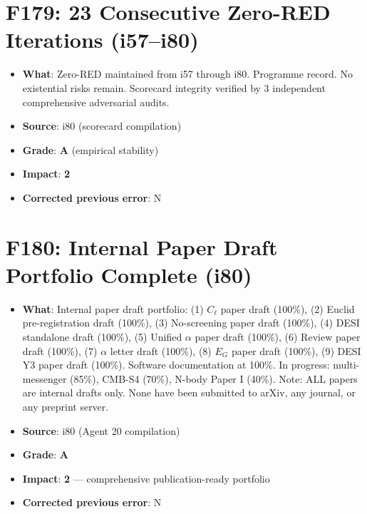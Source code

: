 \documentclass[11pt,a4paper]{article}
\newcommand{\grade}[1]{\textbf{#1}}
\newcommand{\impact}[1]{\textbf{#1}}
\begin{document}
\section{F179: 23 Consecutive Zero-RED Iterations (i57--i80)}
\begin{itemize}[nosep]
\item \textbf{What}: Zero-RED maintained from i57 through i80. Programme record. No existential risks remain. Scorecard integrity verified by 3 independent comprehensive adversarial audits.
\item \textbf{Source}: i80 (scorecard compilation)
\item \textbf{Grade}: \grade{A} (empirical stability)
\item \textbf{Impact}: \impact{2}
\item \textbf{Corrected previous error}: N
\end{itemize}

\section{F180: Internal Paper Draft Portfolio Complete (i80)}
\begin{itemize}[nosep]
\item \textbf{What}: Internal paper draft portfolio: (1) $C_\ell$ paper draft (100\%), (2) Euclid pre-registration draft (100\%), (3) No-screening paper draft (100\%), (4) DESI standalone draft (100\%), (5) Unified $\alpha$ paper draft (100\%), (6) Review paper draft (100\%), (7) $\alpha$ letter draft (100\%), (8) $E_G$ paper draft (100\%), (9) DESI Y3 paper draft (100\%). Software documentation at 100\%. In progress: multi-messenger (85\%), CMB-S4 (70\%), N-body Paper I (40\%). Note: ALL papers are internal drafts only. None have been submitted to arXiv, any journal, or any preprint server.
\item \textbf{Source}: i80 (Agent 20 compilation)
\item \textbf{Grade}: \grade{A}
\item \textbf{Impact}: \impact{2} --- comprehensive publication-ready portfolio
\item \textbf{Corrected previous error}: N
\end{itemize}


\end{document}
